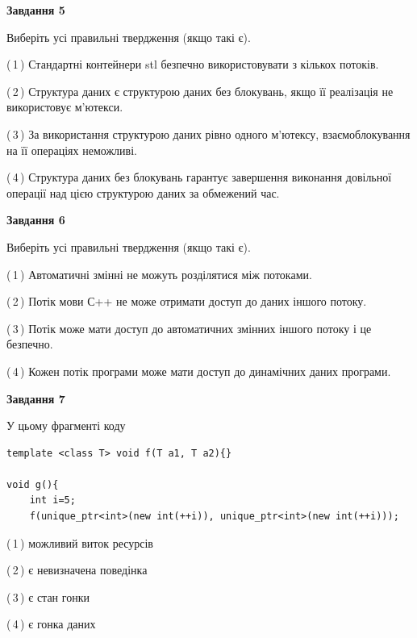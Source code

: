 \documentclass[12pt, ukrainian]{article}
\begin{document}
\begin {large}
{\begin{center}
\textbf{Завдання 5}
\end{center}

Виберіть усі правильні твердження (якщо такі є).\par
\vspace{2mm}

(\,1\,) Стандартні контейнери stl безпечно використовувати з кількох потоків.%

(\,2\,) Структура даних є структурою даних без блокувань, якщо її реалізація не використовує м’ютекси.%

(\,3\,) За використання структурою даних рівно одного м’ютексу, взаємоблокування на її операціях неможливі.%

(\,4\,) Структура даних без блокувань гарантує завершення виконання довільної операції над цією структурою даних за обмежений час.%
\newpage


\begin{center}
\textbf{Завдання 6}
\end{center}

Виберіть усі правильні твердження (якщо такі є).\par
\vspace{2mm}

(\,1\,) Автоматичні змінні не можуть розділятися між потоками.%

(\,2\,) Потік мови С++ не може отримати доступ до даних іншого потоку.%

(\,3\,) Потік може мати доступ до автоматичних змінних іншого потоку і це безпечно.%

(\,4\,) Кожен потік програми може мати доступ до динамічних даних програми.%


\begin{center}
\textbf{Завдання 7}
\end{center}

У цьому фрагменті коду
\begin{verbatim}
template <class T> void f(T a1, T a2){}

void g(){
    int i=5;
    f(unique_ptr<int>(new int(++i)), unique_ptr<int>(new int(++i)));
\end{verbatim}

(\,1\,) можливий виток ресурсів%

(\,2\,) є невизначена поведінка%

(\,3\,) є стан гонки%

(\,4\,) є гонка даних%

}
\end {large}

\vspace{4mm}
\newpage
\end{document}
